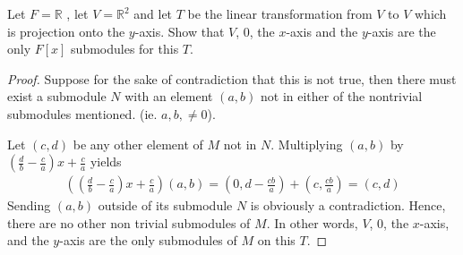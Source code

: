 \documentclass[10pt]{article}
\newcommand{\R}{\mathbb{R}}
\newenvironment{problem}[2][Problem]{\begin{trivlist}
		\item[\hskip \labelsep {\bfseries #1}\hskip \labelsep {\bfseries #2.}]}{\end{trivlist}}
\begin{document}
	\begin{problem}{1.19}
		Let $F = \R$ , let $V = \R^2$ and let $T$ be the linear transformation from $V$ to $V$ which is projection onto the $y$-axis. Show that $V$, $0$, the $x$-axis and the $y$-axis are the only $F[x]$­
		submodules for this $T$.
		\begin{proof}
			Suppose for the sake of contradiction that this is not true, then there must exist a submodule $N$ with an element $(a,b)$ not in either of the nontrivial submodules mentioned. (ie. $a, b, \not = 0$). 
			
			Let $(c,d)$ be any other element of $M$ not in $N$. Multiplying $(a,b)$ by $(\frac{d}{b} - \frac{c}{a})x + \frac{c}{a}$ yields
			\begin{align*}
				((\frac{d}{b} - \frac{c}{a})x + \frac{c}{a})(a,b) =
				(0, d-\frac{cb}{a}) + (c,\frac{cb}{a}) =
				(c,d)
			\end{align*}
			Sending $(a,b)$ outside of its submodule $N$ is obviously a contradiction. Hence, there are no other non trivial submodules of $M$. In other words, $V$, $0$, the $x$-axis, and the $y$-axis are the only submodules of $M$ on this $T$.
		\end{proof}
	\end{problem}
	
\end{document}
